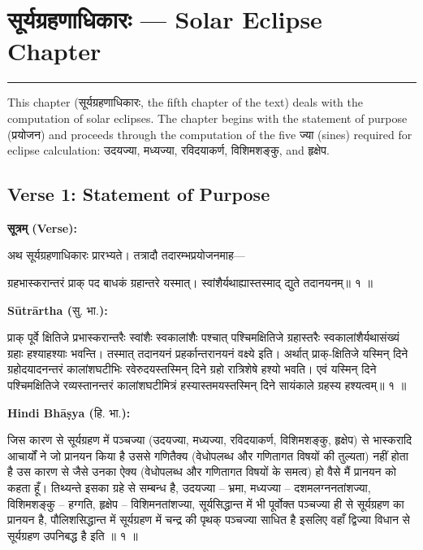 \documentclass[11pt,a4paper]{article}
\newcommand{\dev}[1]{{\devanagarifont #1}}
\newcommand{\arth}{\textbf{Sūtrārtha (}\dev{सु. भा.}\textbf{):}\ }
\newcommand{\hindi}{\textbf{Hindi Bhāṣya (}\dev{हि. भा.}\textbf{):}\ }
\newenvironment{sanskritverse}{%
  \begin{center}\begin{minipage}{0.9\textwidth}
  \setlength{\leftskip}{1em}
  \setlength{\rightskip}{1em}
  \dev
}{\end{minipage}\end{center}}
\begin{document}
\newpage
\section{\dev{सूर्यग्रहणाधिकारः} — Solar Eclipse Chapter}
\label{sec:surya-grahana}

\begin{center}
\textcolor{rulecolor}{\rule{0.8\textwidth}{0.5pt}}
\end{center}

This chapter (\dev{सूर्यग्रहणाधिकारः}, the fifth chapter of the text) deals with the
computation of solar eclipses. The chapter begins with the statement of purpose
(\dev{प्रयोजन}) and proceeds through the computation of the five \dev{ज्या} (sines)
required for eclipse calculation: \dev{उदयज्या}, \dev{मध्यज्या}, \dev{रविदयाकर्ण},
\dev{विशिमशङ्कु}, and \dev{हृक्षेप}.

\subsection{Verse 1: Statement of Purpose}

\vspace{0.5em}
\noindent\textbf{\dev{सूत्रम् (Verse):}}
\begin{sanskritverse}
अथ सूर्यग्रहणाधिकारः प्रारभ्यते। तत्रादौ तदारम्भप्रयोजनमाह—
\end{sanskritverse}

\begin{sanskritverse}
ग्रहभास्करान्तरं प्राक् पद बाधकं ग्रहान्तरे यस्मात्।
स्वांशैर्यथाह्यास्तस्माद् द्युते तदानयनम्॥ १ ॥
\end{sanskritverse}

\noindent\arth
\begin{sanskritverse}
प्राक् पूर्वे क्षितिजे प्रभास्करान्तरैः स्वांशैः स्वकालांशैः पश्चात् पश्चिमक्षितिजे
ग्रहास्तरैः स्वकालांशैर्यथासंख्यं ग्रहाः हश्याहश्याः भवन्ति। तस्मात् तदानयनं
प्रहर्कान्तरानयनं वक्ष्ये इति। अर्थात् प्राक्-क्षितिजे यस्मिन् दिने ग्रहोदयादनन्तरं
कालांशघटीभिः रवेरुदयस्तस्मिन् दिने ग्रहो रात्रिशेषे हश्यो भवति। एवं यस्मिन् दिने
पश्चिमक्षितिजे रव्यस्तानन्तरं कालांशघटीमित्रं हस्यास्तमयस्तस्मिन् दिने सायंकाले
ग्रहस्य हश्यत्वम्॥ १ ॥
\end{sanskritverse}

\noindent\hindi
\begin{sanskritverse}
जिस कारण से सूर्यग्रहण में पञ्चज्या (उदयज्या, मध्यज्या, रविदयाकर्ण, विशिमशङ्कु,
हृक्षेप) से भास्करादि आचार्यों ने जो प्रानयन किया है उससे गणितैक्य (वेधोपलब्ध और
गणितागत विषयों की तुल्यता) नहीं होता है उस कारण से जैसे उनका ऐक्य (वेधोपलब्ध और
गणितागत विषयों के समत्व) हो वैसे मैं प्रानयन को कहता हूँ। तिथ्यन्ते इसका ग्रहे से
सम्बन्ध है, उदयज्या -- भ्रमा, मध्यज्या -- दशमलग्ननतांशज्या, विशिमशङ्कु -- हग्गति,
हृक्षेप -- विशिमनतांशज्या, सूर्यसिद्धान्त में भी पूर्वोक्त पञ्चज्या ही से सूर्यग्रहण का
प्रानयन है, पौलिशसिद्धान्त में सूर्यग्रहण में चन्द्र की पृथक् पञ्चज्या साधित है इसलिए
वहाँ द्विज्या विधान से सूर्यग्रहण उपनिबद्ध है इति ॥ १ ॥
\end{sanskritverse}
\end{document}
